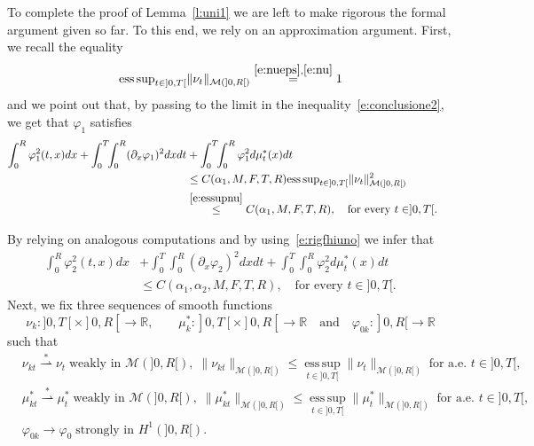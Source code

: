 \documentclass[11pt,leqno]{amsart}
\numberwithin{equation}{section}
\begin{document}
To complete the proof of Lemma~\ref{l:uni1} we are left to make rigorous the formal argument given so far. To this end, we rely on an approximation argument. 
First, we recall the equality
\begin{equation}
\label{e:essupnu}
  \mathrm{ess \, sup}_{t \in ]0, T[} \| \nu_t \|_{\mathcal M(]0, R[)} \stackrel{\eqref{e:nueps},\eqref{e:nu}}{=} 1
\end{equation} 
and we point out that, by passing to the limit in the inequality~\eqref{e:conclusione2}, we get that ${\varphi}_1$ satisfies 
\begin{equation}
  \label{e:rigfhiuno}
  \begin{split}
    \int_0^R {\varphi}_1^2 (t, x) dx + \int_0^T \! \! \int_0^R ({\partial_x }
    {\varphi}_1)^2 dx dt & + \int_0^T \! \! \int_0^R {\varphi}_1^2 d \mu^\ast_t
    (x) dt
    \\
    &
    \leq C(\alpha_1, M, F, T, R) \mathrm{ess \, sup}_{t \in ]0, T[} \| \nu_t \|^2_{\mathcal M (]0, R[)} 
    \\
    & \stackrel{\eqref{e:essupnu}}{\leq}C(\alpha_1, M, F, T, R), \quad
    \text{for every $t \in ]0, T[.$ } \phantom{\int}
  \end{split}
\end{equation}
By relying on analogous computations and by using~\eqref{e:rigfhiuno} we infer that 
\begin{equation}
\label{e:rigfhidue}
\begin{split}
   \int_0^R {\varphi}_2^2 (t, x) dx &
   + \int_0^T \! \! \int_0^R ({\partial_x } {\varphi}_2)^2 dx dt 
   +  \int_0^T \! \! \int_0^R {\varphi}_2^2 d \mu^\ast_t (x) dt \\
   &
  \leq C(\alpha_1, \alpha_2, M, F, T, R),
   \quad \text{for every $t \in ]0, T[.$ } \phantom{\int}
   \end{split}
\end{equation}
Next, we fix three sequences of smooth functions 
$$
\nu_k : ]0, T[ \times ]0, R[ \to {\mathbb{R}}, \qquad  
\mu^\ast_k: ]0, T[ \times ]0, R[ \to {\mathbb{R}} \quad \text{and}
\quad 
{\varphi}_{0k}: ]0, R[ \to {\mathbb{R}}
$$
such that 
\begin{eqnarray}
& \nu_{kt} {\stackrel{*}{\rightharpoonup}} \nu_t \; \text{weakly in $\mathcal M (]0, R[)$}, \;
\| \nu_{kt} \|_{\mathcal M (]0, R[)} \leq 
\operatorname*{ess\,sup}\limits_{t \in ]0, T[} \| \nu_t \|_{\mathcal M (]0, R[)}
\; \text{for a.e. $t \in ]0, T[$,} \\
& \mu^\ast_{kt} {\stackrel{*}{\rightharpoonup}} \mu^\ast_t \; \text{weakly in $\mathcal M (]0, R[)$}, \;
\| \mu^\ast_{kt} \|_{\mathcal M (]0, R[)} \leq 
\operatorname*{ess\,sup}\limits_{t \in ]0, T[} \| \mu^\ast_t \|_{\mathcal M (]0, R[)}
\; \text{for a.e. $t \in ]0, T[$,} \\ 
& {\varphi}_{0k} \to {\varphi}_0 \; \text{strongly in $H^1(]0, R[)$}.
\end{eqnarray}
\end{document}
